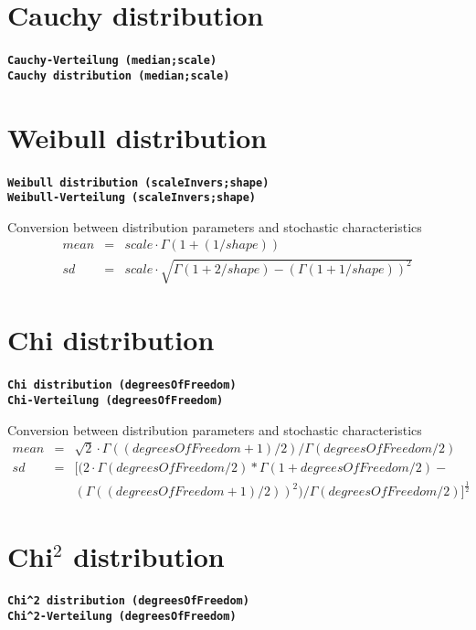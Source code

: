 \documentclass{svmono}
\def\cm#1{\textbf{\texttt{#1}}}
\begin{document}
\section*{Cauchy distribution}
\cm{Cauchy-Verteilung (median;scale)}~\\
\cm{Cauchy distribution (median;scale)}





\section*{Weibull distribution}
\cm{Weibull distribution (scaleInvers;shape)}~\\
\cm{Weibull-Verteilung (scaleInvers;shape)}

Conversion between distribution parameters and stochastic characteristics
\begin{eqnarray*}
mean&=&scale\cdot\Gamma(1+(1/shape))\\
sd&=&scale\cdot\sqrt{\Gamma(1+2/shape)-(\Gamma(1+1/shape))^2}
\end{eqnarray*}





\section*{Chi distribution}
\cm{Chi distribution (degreesOfFreedom)}~\\
\cm{Chi-Verteilung (degreesOfFreedom)}

Conversion between distribution parameters and stochastic characteristics
\begin{eqnarray*}
mean&=&\sqrt{2}\cdot\Gamma((degreesOfFreedom+1)/2)/\Gamma(degreesOfFreedom/2)\\
sd&=&\Big[(2\cdot\Gamma(degreesOfFreedom/2)*\Gamma(1+degreesOfFreedom/2)-\\
~&~&(\Gamma((degreesOfFreedom+1)/2))^2)/\Gamma(degreesOfFreedom/2)\Big]^{\frac{1}{2}}
\end{eqnarray*}





\section*{Chi$^2$ distribution}
\cm{Chi\^{}2 distribution (degreesOfFreedom)}~\\
\cm{Chi\^{}2-Verteilung (degreesOfFreedom)}
\end{document}
